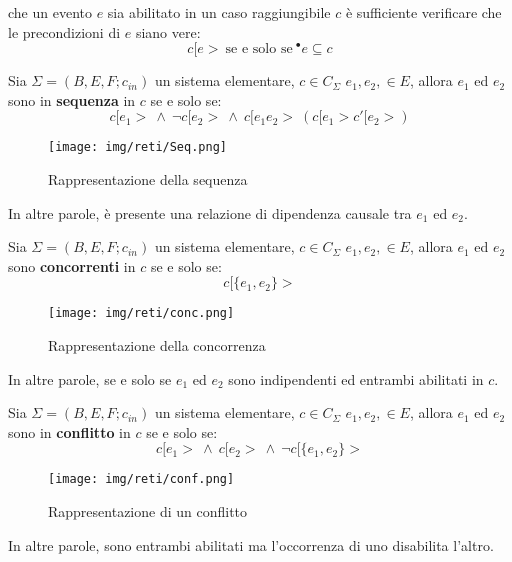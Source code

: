 che un evento $e$ sia abilitato in un caso raggiungibile $c$ è sufficiente
verificare che le precondizioni di $e$ siano vere:
\begin{equation}
    c[e> \ \text{se e solo se} \ ^{\bullet} e \subseteq c
\end{equation}
\begin{definizione}
    Sia $\Sigma = (B, E, F; c_{in})$ un sistema elementare, $c \in C_{\Sigma}$
    $e_1, e_2, \in E$, allora $e_1$ ed $e_2$ sono in \textbf{sequenza} in $c$
    se e solo se:
    \begin{equation}
        c[e_1 > \ \land \ \lnot c[e_2 > \ \land \ c[e_1e_2 > \ (c[e_1 > c'[e_2 >)
    \end{equation}
    \begin{figure}[!ht]
        \centering
        \texttt{[image: img/reti/Seq.png]}
        \caption{Rappresentazione della sequenza}
    \end{figure}
    In altre parole, è presente una relazione di dipendenza causale tra $e_1$ ed
    $e_2$.
\end{definizione}
\begin{definizione}
    Sia $\Sigma = (B, E, F; c_{in})$ un sistema elementare, $c \in C_{\Sigma}$
    $e_1, e_2, \in E$, allora $e_1$ ed $e_2$ sono \textbf{concorrenti} in $c$
    se e solo se:
    \begin{equation}
        c[\{e_1, e_2\} >
    \end{equation}
    \begin{figure}[!ht]
        \centering
        \texttt{[image: img/reti/conc.png]}
        \caption{Rappresentazione della concorrenza}
    \end{figure}
    In altre parole, se e solo se $e_1$ ed $e_2$ sono indipendenti ed entrambi
    abilitati in $c$.
\end{definizione}
\begin{definizione}
    Sia $\Sigma = (B, E, F; c_{in})$ un sistema elementare,
    $c \in C_{\Sigma}$ $e_1, e_2, \in E$, allora $e_1$ ed $e_2$ sono in
    \textbf{conflitto} in $c$ se e solo se:
    \begin{equation}
        c[e_1 > \ \land \ c[e_2 > \ \land \ \lnot c[\{e_1, e_2\} >
    \end{equation}
    \begin{figure}[!ht]
        \centering
        \texttt{[image: img/reti/conf.png]}
        \caption{Rappresentazione di un conflitto}
    \end{figure}
    In altre parole, sono entrambi abilitati ma l'occorrenza di uno disabilita
    l'altro.
\end{definizione}
